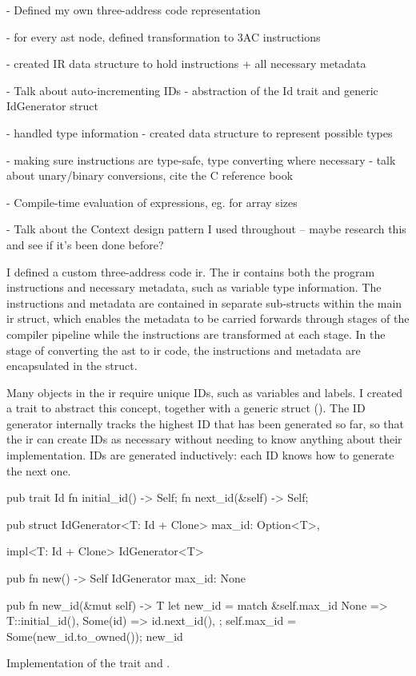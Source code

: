 \documentclass[00-main.tex]{subfiles}
\begin{document}
\begin{mrwComment}
- Defined my own three-address code representation

- for every ast node, defined transformation to 3AC instructions

- created IR data structure to hold instructions + all necessary metadata

- Talk about auto-incrementing IDs - abstraction of the Id trait and generic IdGenerator struct

- handled type information - created data structure to represent possible types

- making sure instructions are type-safe, type converting where necessary - talk about unary/binary conversions, cite the C reference book

- Compile-time evaluation of expressions, eg. for array sizes

- Talk about the Context design pattern I used throughout -- maybe research this and see if it's been done before?
\end{mrwComment}

I defined a custom three-address code \gls{ir}.
The \gls{ir} contains both the program instructions and necessary metadata, such as variable type information.
The instructions and metadata are contained in separate sub-structs within the main \gls{ir} struct, which enables the metadata to be carried forwards through stages of the compiler pipeline while the instructions are transformed at each stage.
In the stage of converting the \gls{ast} to \gls{ir} code, the instructions and metadata are encapsulated in the  struct.

Many objects in the \gls{ir} require unique IDs, such as variables and labels.
I created a  trait to abstract this concept, together with a generic  struct ().
The ID generator internally tracks the highest ID that has been generated so far, so that the \gls{ir} can create IDs as necessary without needing to know anything about their implementation.
IDs are generated inductively: each ID knows how to generate the next one.

\begin{listing}[!ht]
  \begin{RustListing}
    pub trait Id {
        fn initial_id() -> Self;
        fn next_id(&self) -> Self;
    }

    pub struct IdGenerator<T: Id + Clone> {
        max_id: Option<T>,
    }

    impl<T: Id + Clone> IdGenerator<T> {
        pub fn new() -> Self {
            IdGenerator { max_id: None }
        }

        pub fn new_id(&mut self) -> T {
            let new_id = match &self.max_id {
                None => T::initial_id(),
                Some(id) => id.next_id(),
            };
            self.max_id = Some(new_id.to_owned());
            new_id
        }
    }
  \end{RustListing}
  \caption{Implementation of the  trait and .}
  \label{lst:Id and IdGenerator implementation}
\end{listing}
\end{document}

